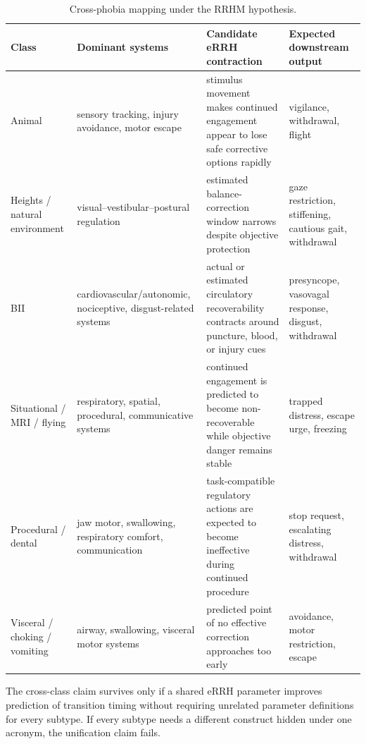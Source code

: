 \documentclass[9pt,twocolumn]{article}
\begin{document}
\begin{table}[t]
\centering
\caption{Cross-phobia mapping under the RRHM hypothesis.}
\small
\begin{tabularx}{\textwidth}{p{}p{}X p{}}
\toprule
\textbf{Class} & \textbf{Dominant systems} & \textbf{Candidate eRRH contraction} & \textbf{Expected downstream output} \\
\midrule
Animal & sensory tracking, injury avoidance, motor escape & stimulus movement makes continued engagement appear to lose safe corrective options rapidly & vigilance, withdrawal, flight \\
Heights / natural environment & visual--vestibular--postural regulation & estimated balance-correction window narrows despite objective protection & gaze restriction, stiffening, cautious gait, withdrawal \\
BII & cardiovascular/autonomic, nociceptive, disgust-related systems & actual or estimated circulatory recoverability contracts around puncture, blood, or injury cues & presyncope, vasovagal response, disgust, withdrawal \\
Situational / MRI / flying & respiratory, spatial, procedural, communicative systems & continued engagement is predicted to become non-recoverable while objective danger remains stable & trapped distress, escape urge, freezing \\
Procedural / dental & jaw motor, swallowing, respiratory comfort, communication & task-compatible regulatory actions are expected to become ineffective during continued procedure & stop request, escalating distress, withdrawal \\
Visceral / choking / vomiting & airway, swallowing, visceral motor systems & predicted point of no effective correction approaches too early & avoidance, motor restriction, escape \\
\bottomrule
\end{tabularx}
\end{table}

The cross-class claim survives only if a shared eRRH parameter improves prediction of transition timing without requiring unrelated parameter definitions for every subtype. If every subtype needs a different construct hidden under one acronym, the unification claim fails.
\end{document}
